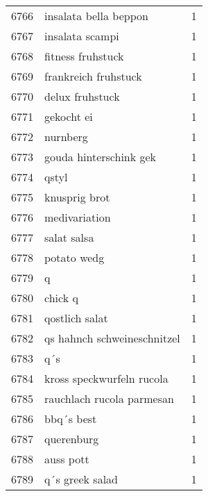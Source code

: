 \begin{tabular}{llr}
6766 &                              insalata bella beppon &      1 \\
6767 &                                    insalata scampi &      1 \\
6768 &                                  fitness fruhstuck &      1 \\
6769 &                               frankreich fruhstuck &      1 \\
6770 &                                    delux fruhstuck &      1 \\
6771 &                                         gekocht ei &      1 \\
6772 &                                           nurnberg &      1 \\
6773 &                             gouda hinterschink gek &      1 \\
6774 &                                              qstyl &      1 \\
6775 &                                      knusprig brot &      1 \\
6776 &                                      medivariation &      1 \\
6777 &                                        salat salsa &      1 \\
6778 &                                        potato wedg &      1 \\
6779 &                                                  q &      1 \\
6780 &                                            chick q &      1 \\
6781 &                                     qostlich salat &      1 \\
6782 &                        qs hahnch schweineschnitzel &      1 \\
6783 &                                                q´s &      1 \\
6784 &                          kross speckwurfeln rucola &      1 \\
6785 &                          rauchlach rucola parmesan &      1 \\
6786 &                                         bbq´s best &      1 \\
6787 &                                         querenburg &      1 \\
6788 &                                          auss pott &      1 \\
6789 &                                    q´s greek salad &      1 \\

\end{tabular}

